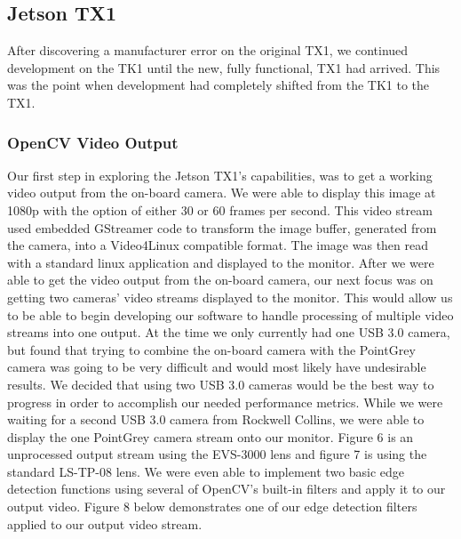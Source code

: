 \documentclass[letterpaper,10pt,titlepage]{IEEEtran}
\begin{document}
   \subsection{Jetson TX1}
   After discovering a manufacturer error on the original TX1, we continued development on the TK1 until the new, fully functional, TX1 had arrived. This was the point when development had completely shifted from the TK1 to the TX1.\\
   
   \subsubsection{OpenCV Video Output}
   Our first step in exploring the Jetson TX1's capabilities, was to get a working video output from the on-board camera. We were able to display this image at 1080p with the option of either 30 or 60 frames per second. This video stream used embedded GStreamer code to transform the image buffer, generated from the camera, into a Video4Linux compatible format. The image was then read with a standard linux application and displayed to the monitor. After we were able to get the video output from the on-board camera, our next focus was on getting two cameras' video streams displayed to the monitor. This would allow us to be able to begin developing our software to handle processing of multiple video streams into one output. At the time we only currently had one USB 3.0 camera, but found that trying to combine the on-board camera with the PointGrey camera was going to be very difficult and would most likely have undesirable results. We decided that using two USB 3.0 cameras would be the best way to progress in order to accomplish our needed performance metrics. While we were waiting for a second USB 3.0 camera from Rockwell Collins, we were able to display the one PointGrey camera stream onto our monitor. Figure 6 is an unprocessed output stream using the EVS-3000 lens and figure 7 is using the standard LS-TP-08 lens. We were even able to implement two basic edge detection functions using several of OpenCV's built-in filters and apply it to our output video. Figure 8 below demonstrates one of our edge detection filters applied to our output video stream.\\
   
\end{document}
